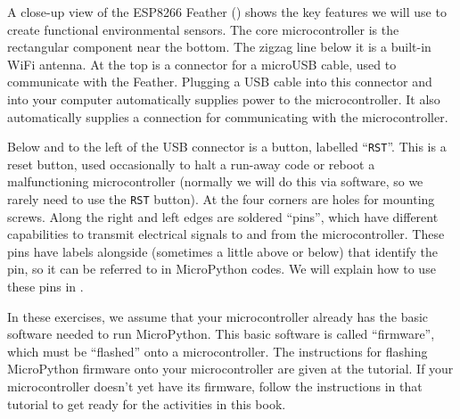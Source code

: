 A close-up view of the ESP8266 Feather () shows the key features we will use to create functional environmental sensors.
The core microcontroller is the rectangular component near the bottom.
The zigzag line below it is a built-in WiFi antenna. 
At the top is a connector for a microUSB cable, used to communicate with the Feather. 
Plugging a USB cable into this connector and into your computer automatically supplies power to the microcontroller. 
It also automatically supplies a connection for communicating with the microcontroller.%

Below and to the left of the USB connector is a button, labelled ``\texttt{RST}''. 
This is a reset button, used occasionally to halt a run-away code or reboot a malfunctioning microcontroller (normally we will do this via software, so we rarely need to use the \texttt{RST} button).
At the four corners are holes for mounting screws. 
Along the right and left edges are soldered ``pins'', %
which have different capabilities to transmit electrical signals to and from the microcontroller. 
These pins have labels alongside (sometimes a little above or below) that identify the pin, so it can be referred to in MicroPython codes. 
We will explain how to use these pins in . 

\begin{kaobox}[frametitle=A flash of insight]
	In these exercises, we assume that your microcontroller already has the basic software needed to run MicroPython. This basic software is called ``firmware'', which must be ``flashed'' onto a microcontroller. The instructions for flashing MicroPython firmware onto your microcontroller are given at the  tutorial. If your microcontroller doesn't yet have its firmware, follow the instructions in that tutorial to get ready for the activities in this book.
\end{kaobox}



